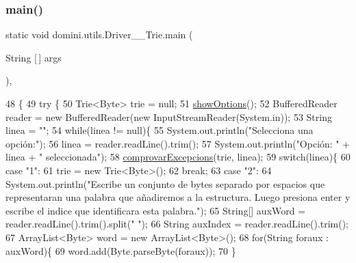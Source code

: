 \subsubsection{\texorpdfstring{main()}{main()}}
{\footnotesize\ttfamily static void domini.\+utils.\+Driver\+\_\+\+\_\+\+Trie.\+main (\begin{DoxyParamCaption}\item[{String \mbox{[}$\,$\mbox{]}}]{args }\end{DoxyParamCaption})\hspace{0.3cm}{\ttfamily [inline]}, {\ttfamily [static]}}


\begin{DoxyCode}
48                                            \{
49     \textcolor{keywordflow}{try} \{
50         Trie<Byte> trie = null;
51         \hyperlink{classdomini_1_1utils_1_1Driver____Trie_a8b61698744500c2c6ffa92f861162ff5}{showOptions}();
52         BufferedReader reader = \textcolor{keyword}{new} BufferedReader(\textcolor{keyword}{new} InputStreamReader(System.in));
53         String linea = \textcolor{stringliteral}{""};
54         \textcolor{keywordflow}{while}(linea != null)\{
55             System.out.println(\textcolor{stringliteral}{"Selecciona una opción:"});
56             linea = reader.readLine().trim();
57             System.out.println(\textcolor{stringliteral}{"Opción: "} + linea + \textcolor{stringliteral}{" seleccionada"});
58             \hyperlink{classdomini_1_1utils_1_1Driver____Trie_a6fd273250b3951144ce3a76f26330ab1}{comprovarExcepcions}(trie, linea);
59             \textcolor{keywordflow}{switch}(linea)\{
60                 \textcolor{keywordflow}{case} \textcolor{stringliteral}{"1"}:
61                     trie = \textcolor{keyword}{new} Trie<Byte>();
62                 \textcolor{keywordflow}{break};
63                 \textcolor{keywordflow}{case} \textcolor{stringliteral}{"2"}:
64                     System.out.println(\textcolor{stringliteral}{"Escribe un conjunto de bytes separado por espacios que
       representaran una palabra que añadiremos a la estructura. Luego presiona enter y escribe el indice que identificara esta
       palabra."});
65                     String[] auxWord = reader.readLine().trim().split(\textcolor{stringliteral}{" "});
66                     String auxIndex = reader.readLine().trim();
67                     ArrayList<Byte> word = \textcolor{keyword}{new} ArrayList<Byte>();
68                     \textcolor{keywordflow}{for}(String foraux : auxWord)\{
69                         word.add(Byte.parseByte(foraux));
70                     \}

\end{DoxyCode}
